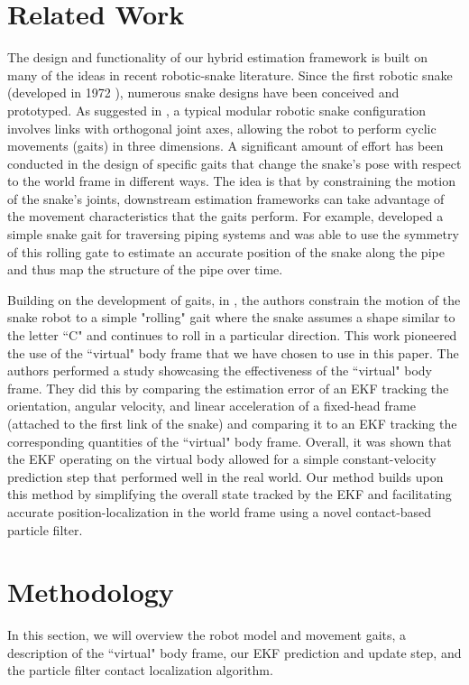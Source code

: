 \documentclass[letterpaper, 10 pt, conference]{ieeeconf}  %
\begin{document}
\section{Related Work}

The design and functionality of our hybrid estimation framework is built on many of the ideas in recent robotic-snake literature. Since the first robotic snake (developed in 1972 \cite{old_snakes}), numerous snake designs have been conceived and prototyped. As suggested in \cite{state_est_snake_robots}, a typical modular robotic snake configuration involves links with orthogonal joint axes, allowing the robot to perform cyclic movements (gaits) in three dimensions. A significant amount of effort has been conducted in the design of specific gaits that change the snake's pose with respect to the world frame in different ways. The idea is that by constraining the motion of the snake's joints, downstream estimation frameworks can take advantage of the movement characteristics that the gaits perform. For example, \cite{pipeline_inspection} developed a simple snake gait for traversing piping systems and was able to use the symmetry of this rolling gate to estimate an accurate position of the snake along the pipe and thus map the structure of the pipe over time.  

Building on the development of gaits, in \cite{state_est_snake_robots}, the authors constrain the motion of the snake robot to a simple "rolling" gait where the snake assumes a shape similar to the letter ``C" and continues to roll in a particular direction. This work pioneered the use of the ``virtual" body frame that we have chosen to use in this paper. The authors performed a study showcasing the effectiveness of the ``virtual" body frame. They did this by comparing the estimation error of an EKF tracking the orientation, angular velocity, and linear acceleration of a fixed-head frame (attached to the first link of the snake) and comparing it to an EKF tracking the corresponding quantities of the ``virtual" body frame. Overall, it was shown that the EKF operating on the virtual body allowed for a simple constant-velocity prediction step that performed well in the real world. Our method builds upon this method by simplifying the overall state tracked by the EKF and facilitating accurate position-localization in the world frame using a novel contact-based particle filter. 

\section{Methodology}
In this section, we will overview the robot model and movement gaits, a description of the ``virtual" body frame, our EKF prediction and update step, and the particle filter contact localization algorithm. 
\end{document}
